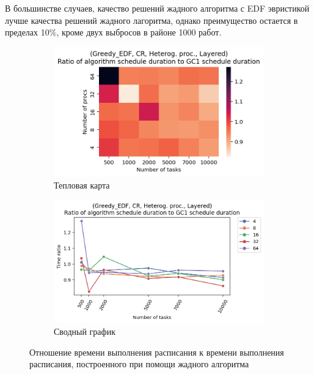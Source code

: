 В большинстве случаев, качество решений жадного алгоритма с EDF эвристикой лучше качества решений жадного лагоритма, однако преимущество остается в пределах 10\%, кроме двух выбросов в районе 1000 работ. 


\begin{figure}[!htbp]
    \centering
    \begin{subfigure}{0.49\textwidth}
        \includegraphics[width=\textwidth]{imgs/unbalanced/CR_EDF/times.png}
        \caption{Тепловая карта}
        \label{fig:CR-disbalanced-EDF-times-heatmap}
    \end{subfigure}
    \hfill
    \begin{subfigure}{0.49\textwidth}
        \includegraphics[width=\textwidth]{imgs/unbalanced/CR_EDF/gr_amalgamated.png}
        \caption{Сводный график}
        \label{fig:CR-disbalanced-EDF-times-compiled} 
    \end{subfigure}
    \caption{Отношение времени выполнения расписания к времени выполнения расписания, построенного при помощи жадного алгоритма}
\end{figure}

